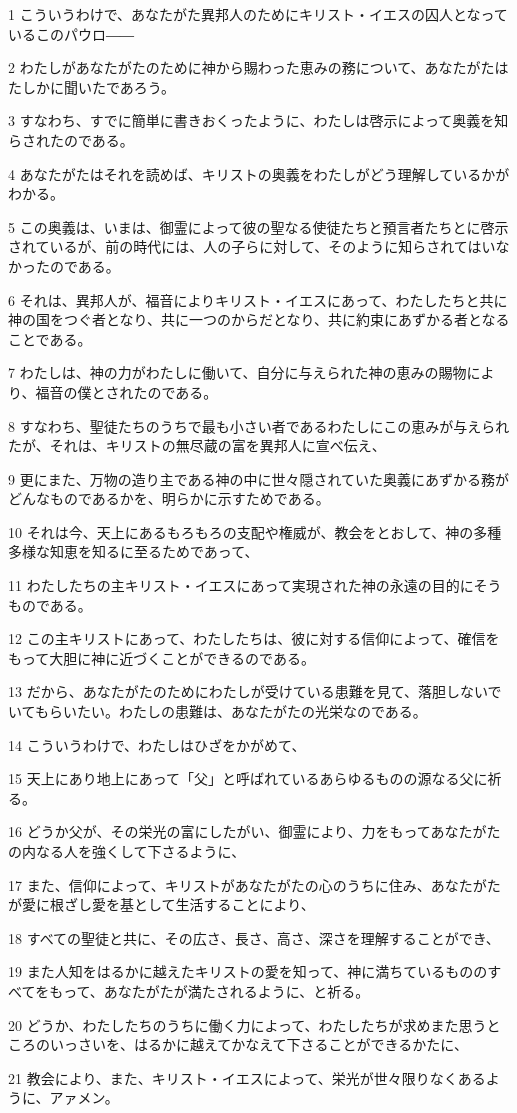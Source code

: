 \par 1 こういうわけで、あなたがた異邦人のためにキリスト・イエスの囚人となっているこのパウロ――
\par 2 わたしがあなたがたのために神から賜わった恵みの務について、あなたがたはたしかに聞いたであろう。
\par 3 すなわち、すでに簡単に書きおくったように、わたしは啓示によって奥義を知らされたのである。
\par 4 あなたがたはそれを読めば、キリストの奥義をわたしがどう理解しているかがわかる。
\par 5 この奥義は、いまは、御霊によって彼の聖なる使徒たちと預言者たちとに啓示されているが、前の時代には、人の子らに対して、そのように知らされてはいなかったのである。
\par 6 それは、異邦人が、福音によりキリスト・イエスにあって、わたしたちと共に神の国をつぐ者となり、共に一つのからだとなり、共に約束にあずかる者となることである。
\par 7 わたしは、神の力がわたしに働いて、自分に与えられた神の恵みの賜物により、福音の僕とされたのである。
\par 8 すなわち、聖徒たちのうちで最も小さい者であるわたしにこの恵みが与えられたが、それは、キリストの無尽蔵の富を異邦人に宣べ伝え、
\par 9 更にまた、万物の造り主である神の中に世々隠されていた奥義にあずかる務がどんなものであるかを、明らかに示すためである。
\par 10 それは今、天上にあるもろもろの支配や権威が、教会をとおして、神の多種多様な知恵を知るに至るためであって、
\par 11 わたしたちの主キリスト・イエスにあって実現された神の永遠の目的にそうものである。
\par 12 この主キリストにあって、わたしたちは、彼に対する信仰によって、確信をもって大胆に神に近づくことができるのである。
\par 13 だから、あなたがたのためにわたしが受けている患難を見て、落胆しないでいてもらいたい。わたしの患難は、あなたがたの光栄なのである。
\par 14 こういうわけで、わたしはひざをかがめて、
\par 15 天上にあり地上にあって「父」と呼ばれているあらゆるものの源なる父に祈る。
\par 16 どうか父が、その栄光の富にしたがい、御霊により、力をもってあなたがたの内なる人を強くして下さるように、
\par 17 また、信仰によって、キリストがあなたがたの心のうちに住み、あなたがたが愛に根ざし愛を基として生活することにより、
\par 18 すべての聖徒と共に、その広さ、長さ、高さ、深さを理解することができ、
\par 19 また人知をはるかに越えたキリストの愛を知って、神に満ちているもののすべてをもって、あなたがたが満たされるように、と祈る。
\par 20 どうか、わたしたちのうちに働く力によって、わたしたちが求めまた思うところのいっさいを、はるかに越えてかなえて下さることができるかたに、
\par 21 教会により、また、キリスト・イエスによって、栄光が世々限りなくあるように、アァメン。

